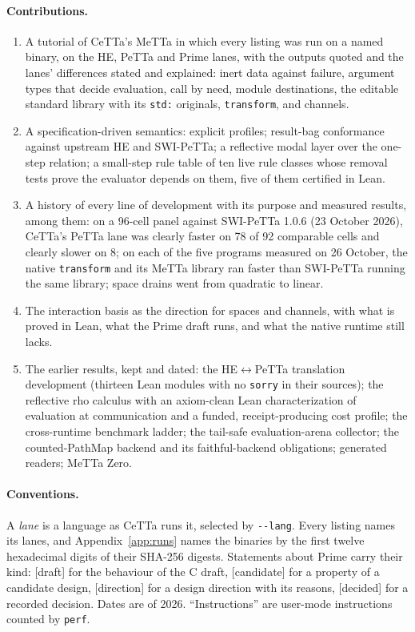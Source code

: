 \documentclass[11pt]{article}
\newcommand{\code}[1]{\texttt{#1}}
\newcommand{\kind}[1]{\textsf{\small[#1]}}
\newcommand{\PeTTa}{\textup{PeTTa}}
\newcommand{\HE}{\textup{HE}}
\newcommand{\CeTTa}{\textup{CeTTa}}
\newcommand{\PathMap}{\textup{PathMap}}
\begin{document}
\paragraph{Contributions.}
\begin{enumerate}
\item A tutorial of \CeTTa{}'s MeTTa in which every listing was run on a named
  binary, on the \HE{}, \PeTTa{} and Prime lanes, with the outputs quoted and
  the lanes' differences stated and explained: inert data against failure,
  argument types that decide evaluation, call by need, module destinations,
  the editable standard library with its \code{std:} originals, \code{transform},
  and channels.
\item A specification-driven semantics: explicit profiles; result-bag
  conformance against upstream \HE{} and SWI-\PeTTa{}; a reflective modal
  layer over the one-step relation; a small-step rule table of ten live rule
  classes whose removal tests prove the evaluator depends on them, five of them
  certified in Lean.
\item A history of every line of development with its purpose and measured
  results, among them: on a 96-cell panel against SWI-\PeTTa{} 1.0.6
  (23 October 2026), \CeTTa{}'s \PeTTa{} lane was clearly faster on 78 of 92
  comparable cells and clearly slower on 8; on each of the five programs
  measured on 26 October, the native \code{transform} and its MeTTa library
  ran faster than SWI-\PeTTa{} running the same library; space drains went
  from quadratic to linear.
\item The interaction basis as the direction for spaces and channels, with
  what is proved in Lean, what the Prime draft runs, and what the native
  runtime still lacks.
\item The earlier results, kept and dated: the
  \HE{}$\leftrightarrow$\PeTTa{} translation development (thirteen Lean
  modules with no \code{sorry} in their sources); the reflective rho
  calculus with an axiom-clean Lean characterization of evaluation at
  communication and a funded, receipt-producing cost profile; the
  cross-runtime benchmark ladder; the tail-safe evaluation-arena collector;
  the counted-\PathMap{} backend and its faithful-backend obligations;
  generated readers; MeTTa Zero.
\end{enumerate}

\paragraph{Conventions.}  A \emph{lane} is a language as \CeTTa{} runs it,
selected by \code{-{}-lang}.  Every listing names its lanes, and
Appendix~\ref{app:runs} names the binaries by the first twelve hexadecimal
digits of their SHA-256 digests.  Statements about Prime carry their kind:
\kind{draft} for the behaviour of the C draft, \kind{candidate} for a
property of a candidate design, \kind{direction} for a design direction with
its reasons, \kind{decided} for a recorded decision.  Dates are of 2026.
``Instructions'' are user-mode instructions counted by \code{perf}.
\end{document}
